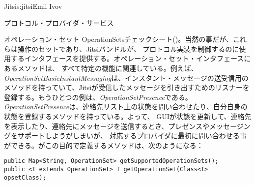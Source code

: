\begin{aosachapter}{Jitsi}{s:jitsi}{Emil Ivov}
\begin{aosasect1}{プロトコル・プロバイダ・サービス}
\begin{aosasect2}{オペレーション・セット}
OperationSetsチェックシート()。当然の事だが、これらは操作のセットであり、Jitsiバンドルが、
プロトコル実装を制御するのに使用するインタフェースを提供する。オペレーション・セット・インタフェースにあるメソッドは、
すべて特定の機能に関連している。例えば、\emph{OperationSetBasicInstantMessaging}は、インスタント・メッセージの送受信用の
メソッドを持っていて、Jitsiが受信したメッセージを引き出すためのリスナーを登録する。もうひとつの例は、\emph{OperationSetPresence}である。
\emph{OperationSetPresence}は、連絡先リスト上の状態を問い合わせたり、自分自身の状態を登録するメソッドを持っている。よって、
GUIが状態を更新して、連絡先を表示したり、連絡先にメッセージを送信するとき、プレゼンスやメッセージングをサポートしようがしまいが、
対応するプロバイダに最初に問い合わせる事ができる。がこの目的で定義するメソッドは、次のようになる：

\begin{verbatim}
public Map<String, OperationSet> getSupportedOperationSets();
public <T extends OperationSet> T getOperationSet(Class<T> opsetClass);
\end{verbatim}


\end{aosasect2}
\end{aosasect1}
\end{aosachapter}
